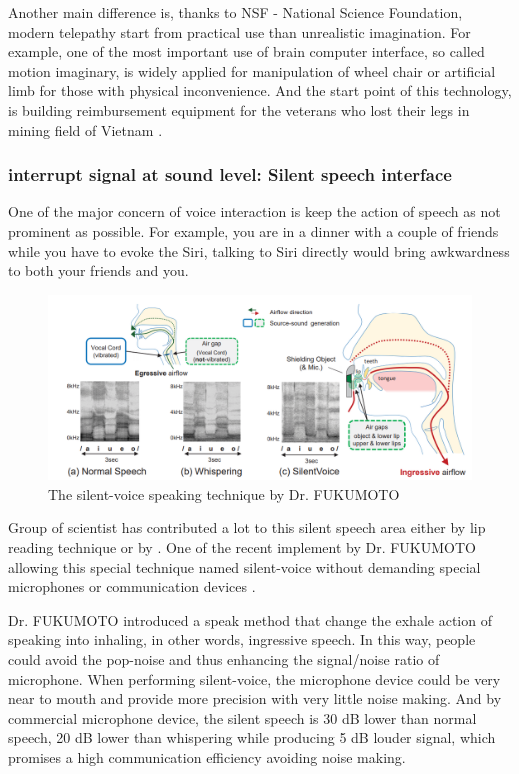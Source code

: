 \documentclass[a4paper]{article}
\begin{document}
Another main difference is, thanks to NSF - National Science Foundation, modern telepathy start from practical use than unrealistic imagination. For example, one of the most important use of brain computer interface, so called motion imaginary, is widely applied for manipulation of wheel chair or artificial limb for those with physical inconvenience. And the start point of this technology, is building reimbursement equipment for the veterans who lost their legs in mining field of Vietnam \autocite{zander2014towards}.

\subsubsection{interrupt signal at sound level: Silent speech interface}

One of the major concern of voice interaction is keep the action of speech as not prominent as possible. For example, you are in a dinner with a couple of friends while you have to evoke the Siri, talking to Siri directly would bring awkwardness to both your friends and you.

\begin{figure}
	\centering
	\includegraphics[width= \linewidth]{silentvoice}
	\caption{The silent-voice speaking technique by Dr. FUKUMOTO}
	\label{fig:P300}
\end{figure}

Group of scientist has contributed a lot to this silent speech area either by lip reading technique or by . One of the recent implement by Dr. FUKUMOTO allowing this special technique named silent-voice without demanding special microphones or communication devices \autocite{fukumoto2018silentvoice}.

Dr. FUKUMOTO introduced a speak method that change the exhale action of speaking into inhaling, in other words, ingressive speech. In this way, people could avoid the pop-noise and thus enhancing the signal/noise ratio of microphone. When performing silent-voice, the microphone device could be very near to mouth and provide more precision with very little noise making. And by commercial microphone device, the silent speech is 30 dB lower than normal speech, 20 dB lower than whispering while producing 5 dB louder signal, which promises a high communication efficiency avoiding noise making.  
\end{document}
